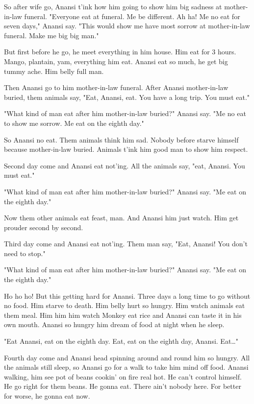 So after wife go, Anansi t'ink how him going to show him big sadness at mother-in-law funeral. "Everyone eat at funeral. Me be different. Ah ha! Me no eat for seven days," Anansi say. "This would show me have most sorrow at mother-in-law funeral. Make me big big man."

But first before he go, he meet everything in him house. Him eat for 3 hours. Mango, plantain, yam, everything him eat. Anansi eat so much, he get big tummy ache. Him belly full man.

Then Anansi go to him mother-in-law funeral. After Anansi mother-in-law buried, them animals say, "Eat, Anansi, eat. You have a long trip. You must eat."

"What kind of man eat after him mother-in-law buried?" Anansi say. "Me no eat to show me sorrow. Me eat on the eighth day."

So Anansi no eat. Them animals think him sad. Nobody before starve himself because mother-in-law buried. Animals t'ink him good man to show him respect.

Second day come and Anansi eat not'ing. All the animals say, "eat, Anansi. You must eat."

"What kind of man eat after him mother-in-law buried?" Anansi say. "Me eat on the eighth day."

Now them other animals eat feast, man. And Anansi him just watch. Him get prouder second by second.

Third day come and Anansi eat not'ing. Them man say, "Eat, Anansi! You don't need to stop."

"What kind of man eat after him mother-in-law buried?" Anansi say. "Me eat on the eighth day."

Ho ho ho! But this getting hard for Anansi. Three days a long time to go without no food. Him starve to death. Him belly hurt so hungry. Him watch animals eat them meal. Him him him watch Monkey eat rice and Anansi can taste it in his own mouth. Anansi so hungry him dream of food at night when he sleep.

"Eat Anansi, eat on the eighth day. Eat, eat on the eighth day, Anansi. Eat\dots"

Fourth day come and Anansi head spinning around and round him so hungry. All the animals still sleep, so Anansi go for a walk to take him mind off food. Anansi walking, him see pot of beans cookin' on fire real hot. He can't control himself. He go right for them beans. He gonna eat. There ain't nobody here. For better for worse, he gonna eat now.

